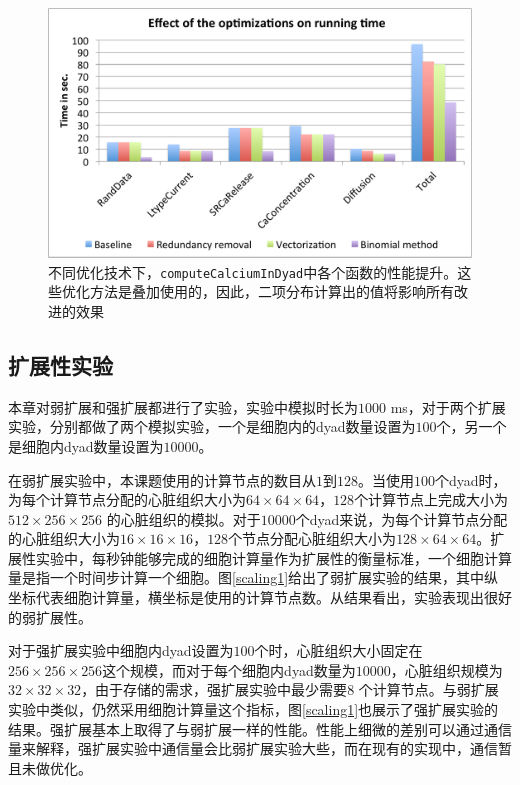 \begin{figure}[htb]
\center
\includegraphics[width=\textwidth]{figs/optimization.pdf}
\caption{不同优化技术下，{\tt computeCalciumInDyad}中各个函数的性能提升。这些优化方法是叠加使用的，因此，二项分布计算出的值将影响所有改进的效果}
\label{fig:optimizations}
\end{figure} 

\subsection{扩展性实验}
本章对弱扩展和强扩展都进行了实验，实验中模拟时长为$1000$ ms，对于两个扩展实验，分别都做了两个模拟实验，一个是细胞内的dyad数量设置为$100$个，另一个是细胞内dyad数量设置为$10000$。

在弱扩展实验中，本课题使用的计算节点的数目从$1$到$128$。当使用$100$个dyad时，为每个计算节点分配的心脏组织大小为$64\times64\times64$，$128$个计算节点上完成大小为$512\times256\times256$ 的心脏组织的模拟。对于$10000$个dyad来说，为每个计算节点分配的心脏组织大小为$16\times16\times16$，$128$个节点分配心脏组织大小为$128\times64\times64$。扩展性实验中，每秒钟能够完成的细胞计算量作为扩展性的衡量标准，一个细胞计算量是指一个时间步计算一个细胞。图\ref{scaling1}给出了弱扩展实验的结果，其中纵坐标代表细胞计算量，横坐标是使用的计算节点数。从结果看出，实验表现出很好的弱扩展性。

对于强扩展实验中细胞内dyad设置为$100$个时，心脏组织大小固定在$256\times256\times256$这个规模，而对于每个细胞内dyad数量为$10000$，心脏组织规模为$32\times32\times32$，由于存储的需求，强扩展实验中最少需要$8$ 个计算节点。与弱扩展实验中类似，仍然采用细胞计算量这个指标，图\ref{scaling1}也展示了强扩展实验的结果。强扩展基本上取得了与弱扩展一样的性能。性能上细微的差别可以通过通信量来解释，强扩展实验中通信量会比弱扩展实验大些，而在现有的实现中，通信暂且未做优化。

